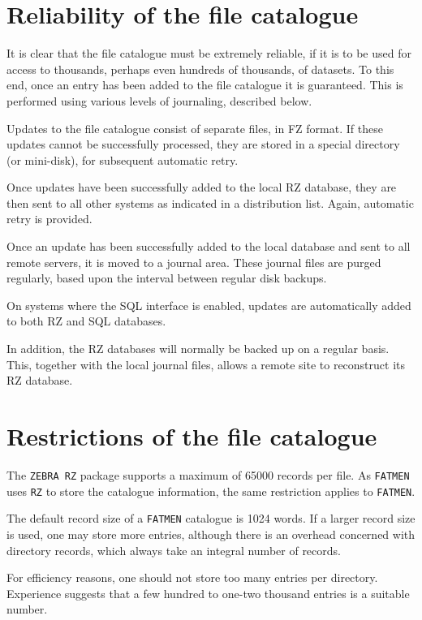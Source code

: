 \section{Reliability of the file catalogue}
\par
It is clear that the file catalogue must be extremely reliable, if
it is to be used for access to thousands, perhaps even hundreds of
thousands, of datasets. To this end, once an entry has been
added to the file catalogue it is guaranteed. This is performed using
various levels of journaling, described below.
\begin{OL}
\item
Updates to the file catalogue consist of separate files, in FZ format.
If these updates cannot be successfully processed, they are stored
in a special directory (or mini-disk), for subsequent automatic retry.
\item
Once updates have been successfully added to the local RZ database,
they are then sent to all other systems
as indicated in a distribution list. 
Again, automatic retry is provided.
\item
Once an update has been successfully added to the local database
and sent to all remote servers, it is moved to a journal area.
These journal files are purged regularly, based upon the
interval between regular disk backups.
\item
On systems where the SQL interface is enabled, updates 
are automatically added to both RZ and SQL databases.
\item
In addition, the RZ databases will normally be backed up on
a regular basis. This, together with the local journal files,
allows a remote site to reconstruct its RZ database.
\end{OL}
\section{Restrictions of the file catalogue}

The {\tt ZEBRA RZ} package supports a maximum of 65000 records
per file. As {\tt FATMEN} uses {\tt RZ} to store the catalogue
information, the same restriction applies to {\tt FATMEN}.

The default record size of a {\tt FATMEN} catalogue is 1024 words.
If a larger record size is used, one may store more entries,
although there is an overhead concerned with directory records,
which always take an integral number of records.

For efficiency reasons, one should not store too many entries
per directory. Experience suggests that a few hundred to one-two
thousand entries is a suitable number.
